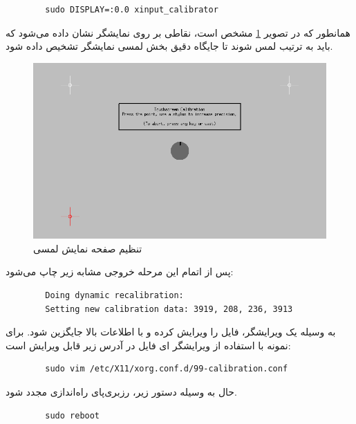 \begin{latin}
    \begin{lstlisting}
        sudo DISPLAY=:0.0 xinput_calibrator
    \end{lstlisting}
\end{latin}

همانطور که در تصویر \ref{calibrate} مشخص است، نقاطی بر روی نمایشگر نشان داده می‌شود که باید به ترتیب لمس شوند تا جایگاه دقیق بخش لمسی نمایشگر تشخیص داده شود.
\begin{figure}[t!]
    \centering
    \includegraphics[scale=0.5]{figures/calibrate.png}
    \caption{تنظیم صفحه نمایش لمسی }
    \label{calibrate}
\end{figure}

پس از اتمام این مرحله خروجی مشابه زیر چاپ می‌شود:
\begin{latin}
    \begin{lstlisting}
        Doing dynamic recalibration:
        Setting new calibration data: 3919, 208, 236, 3913
    \end{lstlisting}
\end{latin}

به وسیله یک ویرایشگر، فایل  را ویرایش کرده و با اطلاعات بالا جایگزین شود. برای نمونه با استفاده از ویرایشگر  ای فایل در آدرس زیر قابل ویرایش است:
\begin{latin}
    \begin{lstlisting}
        sudo vim /etc/X11/xorg.conf.d/99-calibration.conf
    \end{lstlisting}
\end{latin}

حال به وسیله دستور زیر، رزبری‌پای راه‌اندازی مجدد شود.
\begin{latin}
    \begin{lstlisting}
        sudo reboot
    \end{lstlisting}
\end{latin}


